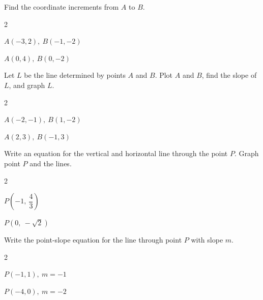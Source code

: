\documentclass[11pt]{article}
\begin{document}
    \noindent Find the coordinate increments from $A$ to $B$.

    \begin{enumerate}

        \begin{multicols}{2}
            \item $\displaystyle A(-3, 2),\ B(-1, -2)$\\[3ex]
            \item $\displaystyle A(0, 4),\ B(0, -2)$\\[3ex]
        \end{multicols}

        \noindent Let $L$ be the line determined by points $A$ and $B$. Plot $A$ and $B$, find the slope of $L$, and graph $L$.

        \begin{multicols}{2}
            \item $\displaystyle A(-2, -1),\ B(1, -2)$\\[1ex]\smallgraph
            \item $\displaystyle A(2, 3),\ B(-1, 3)$\\[1ex]\smallgraph
        \end{multicols}

        \vspace{1ex}

        \noindent Write an equation for the vertical and horizontal line through the point $P$. Graph point $P$ and the lines.

        \begin{multicols}{2}
            \item $\displaystyle P\!\left(-1,\ \dfrac{4}{3}\right)$\\[1ex]\smallgraph
            \item $\displaystyle P\!\left(0,\ -\sqrt{2}\right)$\\[1ex]\smallgraph
        \end{multicols}

        \vspace{1ex}

        \noindent Write the point-slope equation for the line through point $P$ with slope $m$.

        \begin{multicols}{2}
            \item $\displaystyle P(-1, 1),\ m = -1$\\[4ex]
            \item $\displaystyle P(-4, 0),\ m = -2$\\[4ex]
        \end{multicols}


\end{enumerate}
\end{document}
